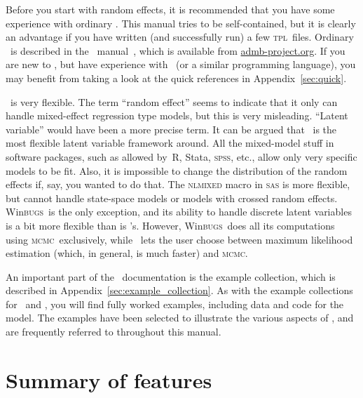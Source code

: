 \documentclass{admbmanual}
\newcommand{\scMCMC}{\textsc{mcmc}}
\newcommand{\scWinBUGS}{Win\textsc{bugs}}
\begin{document}
Before you start with random effects, it is recommended that you have some
experience with ordinary \scAB. This manual tries to be self-contained, but it
is clearly an advantage if you have written (and successfully run) a few
\textsc{tpl}~files. Ordinary \scAB\ is described in the \scAB\
manual~\cite{admb_manual}, which is available from
\href{mailto:admb-project.org}{admb-project.org}. If you are new to \scAB, but
have experience with \cplus\ (or a similar programming language), you may
benefit from taking a look at the quick references in Appendix~\ref{sec:quick}.

\scAR\ is very flexible. The term ``random effect'' seems to indicate that it
only can handle mixed-effect regression type models, but this is very
misleading. ``Latent variable'' would have been a more precise term. It can be
argued that \scAR\ is the most flexible latent variable framework around. All
the mixed-model stuff in software packages, such as allowed by~R, Stata,
\textsc{spss}, etc., allow only very specific models to be fit. Also, it is
impossible to change the distribution of the random effects if, say, you wanted
to do that. The \textsc{nlmixed} macro in \textsc{sas} is more flexible, but
cannot handle state-space models or models with crossed random effects.
\scWinBUGS\ is the only exception, and its ability to handle discrete latent
variables is a bit more flexible than is \scAR's. However, \scWinBUGS\ does all
its computations using \scMCMC\ exclusively, while \scAR\ lets the user choose
between maximum likelihood estimation (which, in general, is much faster) and
\scMCMC.

An important part of the \scAR\ documentation is the example collection, which
is described in Appendix~\ref{sec:example_collection}. As with the example
collections for \scAB\ and \scAD, you will find fully worked examples, including
data and code for the model. The examples have been selected to illustrate the
various aspects of \scAR, and are frequently referred to throughout this manual.

\section{Summary of features}
\end{document}
